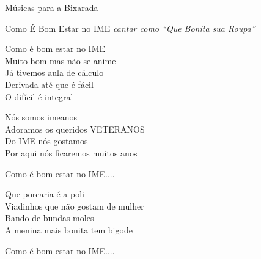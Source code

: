 \begin{secao}{Músicas para a Bixarada}
\begin{subsecao}{Como É Bom Estar no IME}
{\em cantar como ``Que Bonita sua Roupa''}

Como é bom estar no IME \\
Muito bom mas não se anime \\
Já tivemos aula de cálculo \\
Derivada até que é fácil \\
O difícil é integral

Nós somos imeanos \\
Adoramos os queridos VETERANOS \\
Do IME nós gostamos \\
Por aqui nós ficaremos muitos anos
 
Como é bom estar no IME....

Que porcaria é a poli \\
Viadinhos que não gostam de mulher \\
Bando de bundas-moles \\
A menina mais bonita tem bigode

Como é bom estar no IME....
\end{subsecao}
\end{secao}
